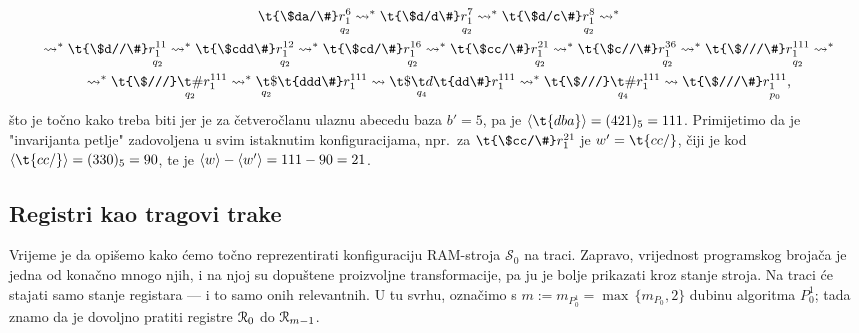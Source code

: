 \begin{primjer}
\begin{multline}
\t{\$da/\#}\underset{\mathclap{q_2}}{r_1^6}
\leadsto^*\t{\$d/d\#}\underset{\mathclap{q_2}}{r_1^7}
\leadsto^*
\t{\$d/c\#}\underset{\mathclap{q_2}}{r_1^8}\leadsto^*\\
\leadsto^*\t{\$d//\#}\underset{\mathclap{q_2}}{r_1^{11}}\leadsto^*
\t{\$cdd\#}\underset{\mathclap{q_2}}{r_1^{12}}\leadsto^*
\t{\$cd/\#}\underset{\mathclap{q_2}}{r_1^{16}}\leadsto^*\t{\$cc/\#}\underset{\mathclap{q_2}}{r_1^{21}}\leadsto^*
\t{\$c//\#}\underset{\mathclap{q_2}}{r_1^{36}}\leadsto^*
\t{\$///\#}\underset{q_2}{r_1^{111}}\leadsto^*\\
\leadsto^*\t{\$///}\underset{\mathclap{q_2}}{\t\#}r_1^{111}\leadsto^*\underset{\mathclap{q_2}}{\t\$}\t{ddd\#}r_1^{111}\leadsto
\t\$\underset{\mathclap{q_4}}{\t d}\t{dd\#}r_1^{111}\leadsto^*
\t{\$///}\underset{\mathclap{q_4}}{\t\#}r_1^{111}\leadsto
\t{\$///\#}\underset{\mathclap{p_0}}{r_1^{111}}\text,
\end{multline}
što je točno kako treba biti jer je za četveročlanu ulaznu abecedu baza $b'=5$, pa je $\kr{\t{dba}}=(421)_5=111$. Primijetimo da je "invarijanta petlje" zadovoljena u svim istaknutim konfiguracijama, npr.\ za $\t{\$cc/\#}r_1^{21}$ je $w'=\t{cc/}$, čiji je kod $\kr{\t{cc/}}=(330)_5=90$, te je $\langle w\rangle-\langle w'\rangle=111-90=21$.
\end{primjer}


\subsection{Registri kao tragovi trake}

Vrijeme je da opišemo kako ćemo točno reprezentirati konfiguraciju RAM-stroja $\mathcal S_0$ na traci.  Zapravo, vrijednost programskog brojača je jedna od konačno mnogo njih, i na njoj su dopuštene proizvoljne transformacije, pa ju je bolje prikazati kroz stanje stroja. Na traci će stajati samo stanje registara --- i to samo onih relevantnih. U tu svrhu, označimo s $m:=m_{P_0^1}=\max\,\{m_{P_0},2\}$ dubinu algoritma $P_0^1$; tada znamo da je dovoljno pratiti registre $\mathcal R_{0}$ do $\mathcal R_{m-1}$.

